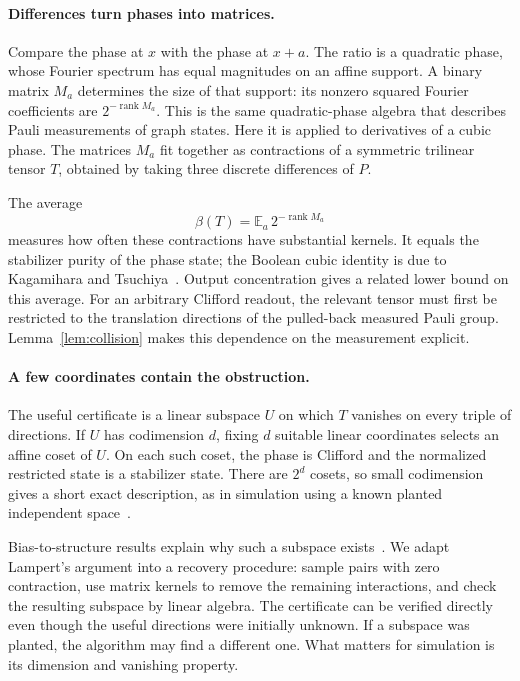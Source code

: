 \documentclass[a4paper,onecolumn,11pt,unpublished]{quantumarticle}
\theoremstyle{plain}
\theoremstyle{remark}
\DeclareMathOperator{\rank}{rank}
\newcommand{\E}{\mathbb{E}}
\begin{document}
\paragraph{Differences turn phases into matrices.}
Compare the phase at $x$ with the phase at $x+a$. The ratio is a quadratic phase, whose Fourier spectrum has equal magnitudes on an affine support. A binary matrix $M_a$ determines the size of that support: its nonzero squared Fourier coefficients are $2^{-\rank M_a}$. This is the same quadratic-phase algebra that describes Pauli measurements of graph states. Here it is applied to derivatives of a cubic phase. The matrices $M_a$ fit together as contractions of a symmetric trilinear tensor $T$, obtained by taking three discrete differences of $P$.

The average
\[
\beta(T)=\E_a\,2^{-\rank M_a}
\]
measures how often these contractions have substantial kernels. It equals the stabilizer purity of the phase state; the Boolean cubic identity is due to Kagamihara and Tsuchiya~\cite{KT26}. Output concentration gives a related lower bound on this average. For an arbitrary Clifford readout, the relevant tensor must first be restricted to the translation directions of the pulled-back measured Pauli group. Lemma~\ref{lem:collision} makes this dependence on the measurement explicit.

\paragraph{A few coordinates contain the obstruction.}
The useful certificate is a linear subspace $U$ on which $T$ vanishes on every triple of directions. If $U$ has codimension $d$, fixing $d$ suitable linear coordinates selects an affine coset of $U$. On each such coset, the phase is Clifford and the normalized restricted state is a stabilizer state. There are $2^d$ cosets, so small codimension gives a short exact description, as in simulation using a known planted independent space~\cite{BGHLQ26}.

Bias-to-structure results explain why such a subspace exists~\cite{HS10,Lam25}. We adapt Lampert's argument into a recovery procedure: sample pairs with zero contraction, use matrix kernels to remove the remaining interactions, and check the resulting subspace by linear algebra. The certificate can be verified directly even though the useful directions were initially unknown. If a subspace was planted, the algorithm may find a different one. What matters for simulation is its dimension and vanishing property.
\end{document}
